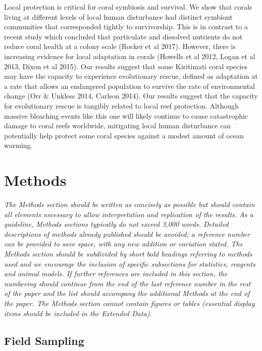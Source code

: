 \documentclass[]{article}
\begin{document}
Local protection is critical for coral symbiosis and survival. We show
that corals living at different levels of local human disturbance had
distinct symbiont communities that corresponded tightly to survivorship.
This is in contrast to a recent study which concluded that particulate
and dissolved nutrients do not reduce coral health at a colony scale
(Rocker et al 2017). However, there is increasing evidence for local
adaptation in corals (Howells et al 2012, Logan et al 2013, Dixon et al
2015). Our results suggest that some Kiritimati coral species may have
the capacity to experience evolutionary rescue, defined as adaptation at
a rate that allows an endangered population to survive the rate of
environmental change (Orr \& Unkless 2014, Carlson 2014). Our results
suggest that the capacity for evolutionary rescue is tangibly related to
local reef protection. Although massive bleaching events like this one
will likely continue to cause catastrophic damage to coral reefs
worldwide, mitigating local human disturbance can potentially help
protect some coral species against a modest amount of ocean warming.

\section*{Methods}\label{methods}

\emph{The Methods section should be written as concisely as possible but
should contain all elements necessary to allow interpretation and
replication of the results. As a guideline, Methods sections typically
do not exceed 3,000 words. Detailed descriptions of methods already
published should be avoided; a reference number can be provided to save
space, with any new addition or variation stated. The Methods section
should be subdivided by short bold headings referring to methods used
and we encourage the inclusion of specific subsections for statistics,
reagents and animal models. If further references are included in this
section, the numbering should continue from the end of the last
reference number in the rest of the paper and the list should accompany
the additional Methods at the end of the paper. The Methods section
cannot contain figures or tables (essential display items should be
included in the Extended Data).}

\subsection{Field Sampling}\label{field-sampling}
\end{document}

